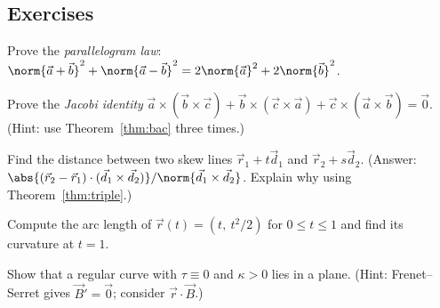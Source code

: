 \subsection*{Exercises}
\begin{exercise}
Prove the \emph{parallelogram law}: $\norm{\vec a+\vec b}^2+\norm{\vec a-\vec b}^2=2\norm{\vec a}^2+2\norm{\vec b}^2$.
\end{exercise}
\begin{exercise}
Prove the \emph{Jacobi identity} $\vec a\times(\vec b\times\vec c)+\vec b\times(\vec c\times\vec a)+\vec c\times(\vec a\times\vec b)=\vec 0$. (Hint: use Theorem~\ref{thm:bac} three times.)
\end{exercise}
\begin{exercise}
Find the distance between two skew lines $\vec r_1+t\vec d_1$ and $\vec r_2+s\vec d_2$. (Answer: $\abs{(\vec r_2-\vec r_1)\cdot(\vec d_1\times\vec d_2)}/\norm{\vec d_1\times\vec d_2}$. Explain why using Theorem~\ref{thm:triple}.)
\end{exercise}
\begin{exercise}
Compute the arc length of $\vec r(t)=(t,\ t^2/2)$ for $0\le t\le 1$ and find its curvature at $t=1$.
\end{exercise}
\begin{exercise}
Show that a regular curve with $\tau\equiv0$ and $\kappa>0$ lies in a plane. (Hint: Frenet--Serret gives $\vec B'=\vec 0$; consider $\vec r\cdot\vec B$.)
\end{exercise}
